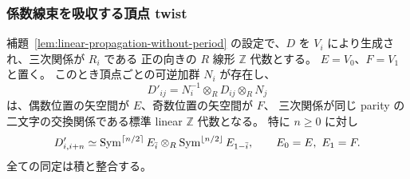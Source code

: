 \subsubsection{係数線束を吸収する頂点 twist}

\begin{theorem}[周期を用いない線型標準形]
\label{thm:linear-normalization-without-period}
補題~\ref{lem:linear-propagation-without-period} の設定で、$D$ を $V_i$ により生成され、三次関係が $R_i$ である
正の向きの $R$ 線形 $\mathbb Z$ 代数とする。
$E=V_0$、$F=V_1$ と置く。
このとき頂点ごとの可逆加群 $N_i$ が存在し、
\[
 D'_{ij}=N_i^{-1}\otimes_R D_{ij}\otimes_R N_j
\]
は、偶数位置の矢空間が $E$、奇数位置の矢空間が $F$、
三次関係が同じ parity の二文字の交換関係である標準 linear $\mathbb Z$ 代数となる。
特に $n\geq0$ に対し
\begin{equation}\label{eq:linear-symmetric-components}
 D'_{i,i+n}\simeq
 \operatorname{Sym}^{\lceil n/2\rceil}E_{\bar i}
       \otimes_R\operatorname{Sym}^{\lfloor n/2\rfloor}E_{1-\bar i},
 \qquad E_0=E,\ E_1=F.
\end{equation}
全ての同定は積と整合する。
\end{theorem}


